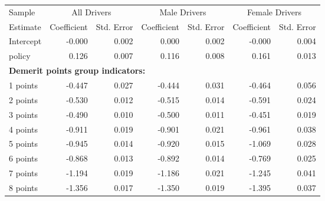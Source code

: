 
\begin{table}%
\centering 
\begin{tabular}{l r r r r r r} 

\hline 
 

Sample 
 & \multicolumn{2}{c}{All  Drivers}  & \multicolumn{2}{c}{Male  Drivers}  & \multicolumn{2}{c}{Female  Drivers}   \\ 
 

 \cmidrule(lr){1-1}\cmidrule(lr){2-3}\cmidrule(lr){4-5}\cmidrule(lr){6-7} 

Estimate  & Coefficient & Std. Error  & Coefficient & Std. Error  & Coefficient & Std. Error   \\ 
 

\hline 
 
Intercept  & -0.000  &  0.002  &  0.000  &  0.002  & -0.000  &  0.004   \\ 
 
policy  &  0.126  &  0.007  &  0.116  &  0.008  &  0.161  &  0.013   \\ 
 

\hline 
 
\multicolumn{4}{l}{\textbf{Demerit points group indicators:}}  \\ 
 
1 points  & -0.447  &  0.027  & -0.444  &  0.031  & -0.464  &  0.056   \\ 
 
2 points  & -0.530  &  0.012  & -0.515  &  0.014  & -0.591  &  0.024   \\ 
 
3 points  & -0.490  &  0.010  & -0.500  &  0.011  & -0.451  &  0.019   \\ 
 
4 points  & -0.911  &  0.019  & -0.901  &  0.021  & -0.961  &  0.038   \\ 
 
5 points  & -0.945  &  0.014  & -0.920  &  0.015  & -1.069  &  0.028   \\ 
 
6 points  & -0.868  &  0.013  & -0.892  &  0.014  & -0.769  &  0.025   \\ 
 
7 points  & -1.194  &  0.019  & -1.186  &  0.021  & -1.245  &  0.041   \\ 
 
8 points  & -1.356  &  0.017  & -1.350  &  0.019  & -1.395  &  0.037   \\ 
 

\end{tabular}
\end{table}

